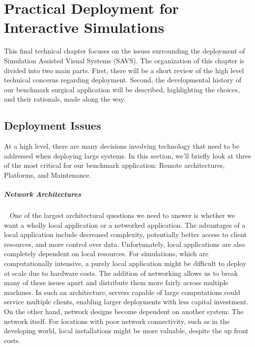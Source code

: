 \chapter{Practical Deployment for Interactive Simulations}
\label{chp:deployment}

This final technical chapter focuses on the issues surrounding the
deployment of Simulation Assisted Visual Systems (SAVS). The
organization of this chapter is divided into two main parts. First,
there will be a short review of the high level technical concerns
regarding deployment. Second, the developmental history of our
benchmark surgical application will be described, highlighting the
choices, and their rationals, made along the way.

\section{Deployment Issues}

At a high level, there are many decisions involving technology that
need to be addressed when deploying large systems. In this section,
we'll briefly look at three of the most critical for our benchmark
application: Remote architectures, Platforms, and Maintenance.

\paragraph{Network Architectures}~ One of the largest architectural
questions we need to answer is whether we want a wholly local
application or a networked application. The advantages of a local
application include decreased complexity, potentially better access to
client resources, and more control over data. Unfortunately, local
applications are also completely dependent on local resources. For
simulations, which are computationally intensive, a purely local
application might be difficult to deploy at scale due to hardware
costs. The addition of networking allows us to break many of these
issues apart and distribute them more fairly across multiple
machines. In such an architecture, servers capable of large
computations could service multiple clients, enabling larger
deployments with less capital investment. On the other hand, network
designs become dependent on another system: The network itself. For
locations with poor network connectivity, such as in the developing
world, local installations might be more valuable, despite the up
front costs.

